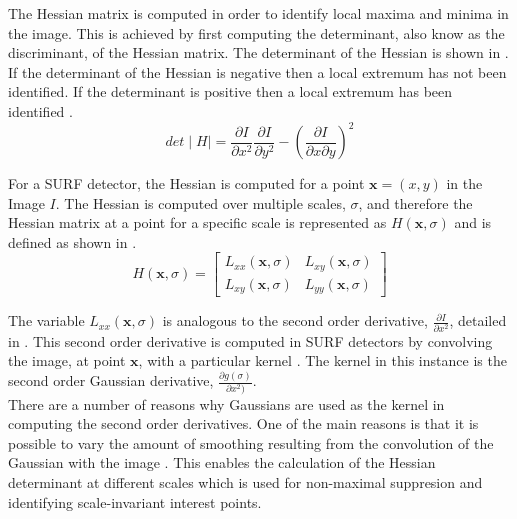 \documentclass{report}
\begin{document}
The Hessian matrix is computed in order to identify local maxima and minima in the image. This is achieved by first computing the determinant, also know as the discriminant, of the Hessian matrix. The determinant of the Hessian is shown in . If the determinant of the Hessian is negative then a local extremum has not been identified. If the determinant is positive then a local extremum has been identified \cite{Evans2009}. \\

\begin{equation}
det\mid H \mid = \frac{\partial I}{\partial x^2} \frac{\partial I}{\partial y^2} - (\frac{\partial I}{\partial x \partial y})^2
\label{eqn:determinant}
\end{equation}

For a SURF detector, the Hessian is computed for a point $\textbf{x} = (x,y)$ in the Image $I$. The Hessian is computed over multiple scales, $\sigma$, and therefore the Hessian matrix at a point for a specific scale is represented as $H(\textbf{x}, \sigma)$ \cite{Lowe2004} and is defined as shown in .\\


\begin{equation}
H(\textbf{x}, \sigma) = \left[ \begin{array}{cc} L_{xx}(\textbf{x}, \sigma) & L_{xy}(\textbf{x}, \sigma)\\
					    L_{xy}(\textbf{x}, \sigma) & L_{yy}(\textbf{x}, \sigma)\end{array} \right]
\label{eqn:hessianScale}
\end{equation}

The variable $L_{xx}(\textbf{x}, \sigma)$ is analogous to the second order derivative, $ \frac{\partial I}{\partial x^2}$, detailed in . This second order derivative is computed in SURF detectors by convolving the image, at point $\textbf{x}$, with a particular kernel \cite{Evans2009}. The kernel in this instance is the second order Gaussian derivative, $\frac{\partial g(\sigma)}{\partial x^2)}$. \\

There are a number of reasons why Gaussians are used as the kernel in computing the second order derivatives. One of the main reasons is that it is possible to vary the amount of smoothing resulting from the convolution of the Gaussian with the image \cite{Evans2009}. This enables the calculation of the Hessian determinant at different scales which is used for non-maximal suppresion and identifying scale-invariant interest points.\\
\end{document}
